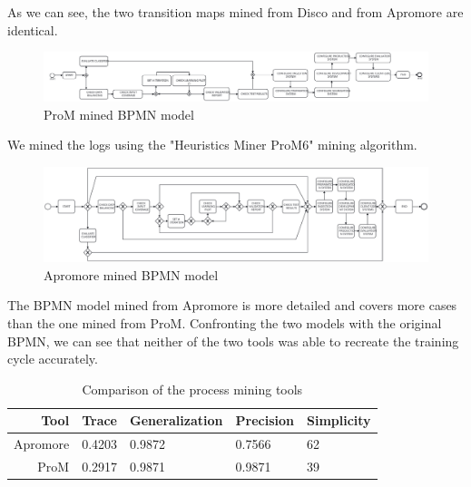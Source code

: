 As we can see, the two transition maps mined from Disco and from 
Apromore are identical.

\begin{figure}[H]
\centering
\includegraphics[width=\textwidth]{figures/prom_mined.pdf}
\caption{ProM mined BPMN model}
\label{fig:prom_mined}
\end{figure}

We mined the logs using the "Heuristics Miner ProM6" mining algorithm.

\begin{figure}[H]
\centering
\includegraphics[width=\textwidth]{figures/apromore_mined.pdf}
\caption{Apromore mined BPMN model}
\label{fig:apromore_mined}
\end{figure}

The BPMN model mined from Apromore is more detailed and
covers more cases than the one mined from ProM.
Confronting the two models with the original BPMN, we can see that neither
of the two tools was able to recreate the training cycle accurately.

\begin{table}[H]
\centering
\begin{tabular}{|r|l|l|l|l|}
\hline
\textbf{Tool} & \textbf{Trace} & \textbf{Generalization} & \textbf{Precision} & \textbf{Simplicity} \\
\hline
Apromore & 0.4203 & 0.9872 & 0.7566 & 62 \\
\hline
ProM & 0.2917 & 0.9871 & 0.9871 & 39 \\
\hline
\end{tabular}
\caption{Comparison of the process mining tools}
\label{tab:process_mining_comparison}
\end{table}